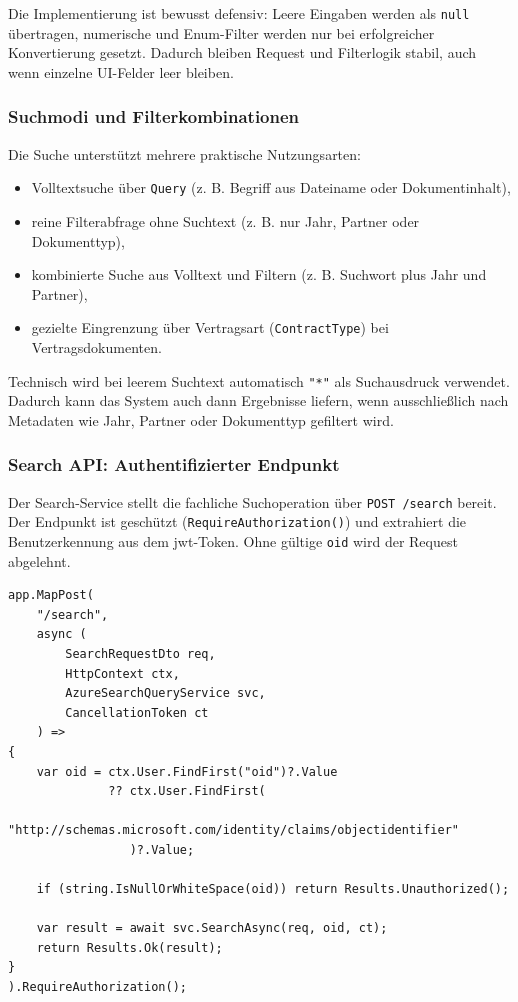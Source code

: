 Die Implementierung ist bewusst defensiv: Leere Eingaben werden als \texttt{null} übertragen, numerische und Enum-Filter werden nur bei erfolgreicher Konvertierung gesetzt. Dadurch bleiben Request und Filterlogik stabil, auch wenn einzelne UI-Felder leer bleiben.

\subsubsection{Suchmodi und Filterkombinationen}

Die Suche unterstützt mehrere praktische Nutzungsarten:
\begin{itemize}
    \item Volltextsuche über \texttt{Query} (z. B. Begriff aus Dateiname oder Dokumentinhalt),
    \item reine Filterabfrage ohne Suchtext (z. B. nur Jahr, Partner oder Dokumenttyp),
    \item kombinierte Suche aus Volltext und Filtern (z. B. Suchwort plus Jahr und Partner),
    \item gezielte Eingrenzung über Vertragsart (\texttt{ContractType}) bei Vertragsdokumenten.
\end{itemize}

Technisch wird bei leerem Suchtext automatisch \texttt{"*"} als Suchausdruck verwendet. Dadurch kann das System auch dann Ergebnisse liefern, wenn ausschließlich nach Metadaten wie Jahr, Partner oder Dokumenttyp gefiltert wird.

\subsubsection{Search API: Authentifizierter Endpunkt}

Der Search-Service stellt die fachliche Suchoperation über \texttt{POST /search} bereit. Der Endpunkt ist geschützt (\texttt{RequireAuthorization()}) und extrahiert die Benutzerkennung aus dem \acrshort{jwt}-Token. Ohne gültige \texttt{oid} wird der Request abgelehnt.

\begin{lstlisting}[language={[Sharp]C},caption={Search-Endpunkt mit Benutzerkontext},label={lst:search-api-endpoint}]
app.MapPost(
    "/search",
    async (
        SearchRequestDto req,
        HttpContext ctx,
        AzureSearchQueryService svc,
        CancellationToken ct
    ) =>
{
    var oid = ctx.User.FindFirst("oid")?.Value
              ?? ctx.User.FindFirst(
                  "http://schemas.microsoft.com/identity/claims/objectidentifier"
                 )?.Value;

    if (string.IsNullOrWhiteSpace(oid)) return Results.Unauthorized();

    var result = await svc.SearchAsync(req, oid, ct);
    return Results.Ok(result);
}
).RequireAuthorization();
\end{lstlisting}


